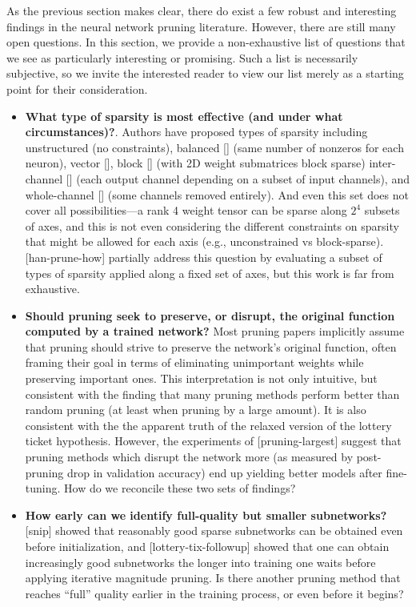 
As the previous section makes clear, there do exist a few robust and interesting findings in the neural network pruning literature. However, there are still many open questions. In this section, we provide a non-exhaustive list of questions that we see as particularly interesting or promising. Such a list is necessarily subjective, so we invite the interested reader to view our list merely as a starting point for their consideration.

\begin{itemize}
\item \textbf{What type of sparsity is most effective (and under what circumstances)?}. Authors have proposed types of sparsity including unstructured (no constraints), balanced [] (same number of nonzeros for each neuron), vector [], block [] (with 2D weight submatrices block sparse) inter-channel [] (each output channel depending on a subset of input channels), and whole-channel [] (some channels removed entirely). And even this set does not cover all possibilities---a rank 4 weight tensor can be sparse along $2^4$ subsets of axes, and this is not even considering the different constraints on sparsity that might be allowed for each axis (e.g., unconstrained vs block-sparse). [han-prune-how] partially address this question by evaluating a subset of types of sparsity applied along a fixed set of axes, but this work is far from exhaustive.

\item \textbf{Should pruning seek to preserve, or disrupt, the original function computed by a trained network?} Most pruning papers implicitly assume that pruning should strive to preserve the network's original function, often framing their goal in terms of eliminating unimportant weights while preserving important ones. This interpretation is not only intuitive, but consistent with the finding that many pruning methods perform better than random pruning (at least when pruning by a large amount). It is also consistent with the the apparent truth of the relaxed version of the lottery ticket hypothesis. However, the experiments of [pruning-largest] suggest that pruning methods which disrupt the network more (as measured by post-pruning drop in validation accuracy) end up yielding better models after fine-tuning. How do we reconcile these two sets of findings?

\item \textbf{How early can we identify full-quality but smaller subnetworks?} [snip] showed that reasonably good sparse subnetworks can be obtained even before initialization, and [lottery-tix-followup] showed that one can obtain increasingly good subnetworks the longer into training one waits before applying iterative magnitude pruning. Is there another pruning method that reaches ``full'' quality earlier in the training process, or even before it begins?


\end{itemize}
